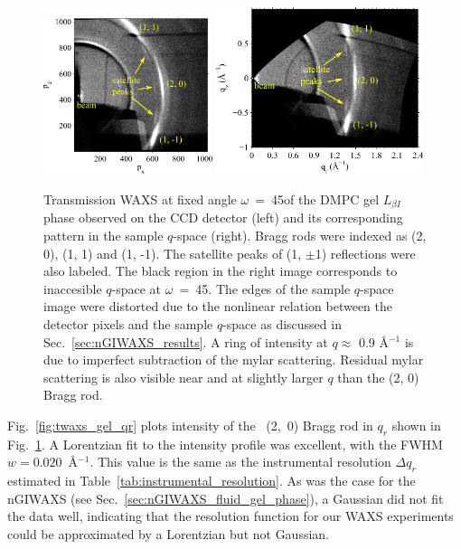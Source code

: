 \begin{figure}[htbp]
  \centering
  \includegraphics[width=0.44\textwidth]{figures/ripple/tWAXS/twaxs_gel_ccd}
  \includegraphics[width=0.54\textwidth]{figures/ripple/tWAXS/twaxs_gel_q}
  \caption[Transmission WAXS at fixed angle $\omega$~=~45\textdegree of the DMPC gel 
  $L_{\beta I}$ phase observed on
  the CCD detector (left) and its corresponding pattern in the sample $q$-space
  (right)]
  {Transmission WAXS at fixed angle $\omega$~=~45\textdegree of the DMPC gel 
  $L_{\beta I}$ phase observed on
  the CCD detector (left) and its corresponding pattern in the sample $q$-space
  (right). Bragg rods were indexed as (2, 0), (1, 1) and (1, -1). The satellite 
  peaks of (1, $\pm$1) reflections were also labeled. The black region in
  the right image corresponds to inaccesible $q$-space at 
  $\omega$~=~45\textdegree. The edges
  of the sample $q$-space image were distorted due to the nonlinear relation
  between the detector pixels and the sample $q$-space as discussed in 
  Sec.~\ref{sec:nGIWAXS_results}. A ring of intensity
  at $q \approx$ 0.9 \AA$^{-1}$ is due to imperfect subtraction of the mylar
  scattering. Residual mylar scattering is also visible near and at slightly 
  larger $q$ than the (2, 0) Bragg rod.}
  \label{fig:twaxs_gel}
\end{figure}

Fig.~\ref{fig:twaxs_gel_qr} plots intensity of the \LbetaI\ (2,~0) Bragg rod in $q_r$
shown in Fig.~\ref{fig:twaxs_gel}. A Lorentzian fit to the intensity profile was excellent, 
with the FWHM $w=0.020$~\AA$^{-1}$. This value is the same as the instrumental resolution
$\Delta q_r$ estimated in Table~\ref{tab:instrumental_resolution}. As was the case 
for the nGIWAXS (see Sec.~\ref{sec:nGIWAXS_fluid_gel_phase}), a Gaussian did not
fit the data well, indicating that the resolution function for our
WAXS experiments could be approximated by a Lorentzian but not Gaussian.

